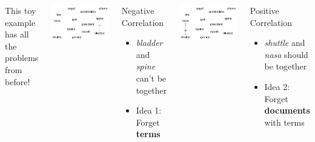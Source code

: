 \documentclass[compress]{beamer}
\begin{document}
{\begin{columns}
		 {  This toy example has all the problems from before!  }
		\only<2-6> {

		\includegraphics[width=\linewidth]{interactive_topic_models/constraints_4}

		\begin{block}{Negative Correlation}

		\begin{itemize}
			\item \emph{bladder} and \emph{spine} can't be together
			\item Idea 1: Forget {\bf terms}
		\end{itemize}


		\end{block}

		}

		 {

		\includegraphics[width=\linewidth]{interactive_topic_models/constraints_5}

		\begin{block}{Positive Correlation}
		\begin{itemize}
			\item \emph{shuttle} and \emph{nasa} should be together
			\item Idea 2: Forget {\bf documents} with terms
		\end{itemize}
		\end{block}

		}

	\end{columns}

}
\end{document}

